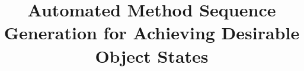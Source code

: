 \documentclass{sig-alternate}
\begin{document}
\title{Automated Method Sequence Generation for Achieving Desirable Object States}
%
%
%
%
%

%

\end{document}
